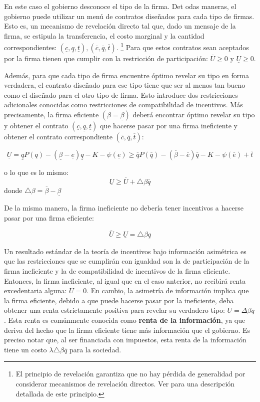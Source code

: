 \documentclass[
  12pt,
  spanish,
]{book}
\begin{document}
En este caso el gobierno desconoce el tipo de la firma. Det odas maneras, el gobierno puede utilizar un menú de contratos diseñados para cada tipo de firmas. Esto es, un mecanismo de revelación directo tal que, dado un mensaje de la firma, se estipula la transferencia, el costo marginal y la cantidad correspondientes: \({(\underline c, \underline q, \underline t), (\overline c, \overline q, \overline t)}\).
\footnote{El principio de revelación garantiza que no hay pérdida de generalidad por considerar mecanismos de revelación directos. Ver \citet{Laffont1993} para una descripción detallada
  de este principio.}
Para que estos contratos sean aceptados por la firma tienen que cumplir con la restricción de participación: \(\overline U \geq 0\) y \(\underline U \geq 0\).

Además, para que cada tipo de firma encuentre óptimo revelar su tipo en forma verdadera, el contrato diseñado para ese tipo tiene que ser al menos tan bueno como el diseñado para el otro tipo de firma. Esto introduce dos restricciones adicionales conocidas como restricciones de compatibilidad de incentivos. Más precisamente, la firma eficiente \((β = \underline β)\) deberá encontrar óptimo revelar su tipo y obtener el contrato \({(\underline c, \underline q, \underline t)}\) que hacerse pasar por una firma ineficiente y obtener el contrato correspondiente \({(\overline c, \overline q, \overline t)}\):

\[
\underline{U}=\underline{q}P\left(q\right)-\left(\underline{\beta}-\underline{e}\right)\underline{q}-K-\psi\left(\underline{e}\right)\geq\overline{q}P\left(\overline{q}\right)-\left(\overline{\beta}-\overline{e}\right)\overline{q}-K-\psi\left(\overline{e}\right)+\overline{t}
\]

o lo que es lo mismo:
\[\underline U \geq \overline U + \triangle \beta \overline q\]
donde \(\triangle \beta = \overline \beta - \underline \beta\)

De la misma manera, la firma ineficiente no debería tener incentivos a hacerse pasar por una firma eficiente:

\[
\overline U \geq \underline U = \triangle \beta \underline q
\]

Un resultado estándar de la teoría de incentivos bajo información asimétrica es que las restricciones que se cumplirán con igualdad son la de participación de la firma ineficiente y la de compatibilidad de incentivos de la firma eficiente. Entonces, la firma ineficiente, al igual que en el caso anterior, no recibirá renta excedentaria alguna: \(U= 0\). En cambio, la asimetría de información implica que la firma eficiente, debido a que puede hacerse pasar por la ineficiente, deba obtener una renta estrictamente positiva para revelar su verdadero tipo: \(U = Δ\beta \overline q\). Esta renta es comúnmente conocida como \textbf{renta de la información}, ya que deriva del hecho que la firma eficiente tiene más información que el gobierno. Es preciso notar que, al ser financiada con impuestos, esta renta de la información tiene un costo \(\lambda \triangle \beta \overline q\) para la sociedad.
\end{document}
